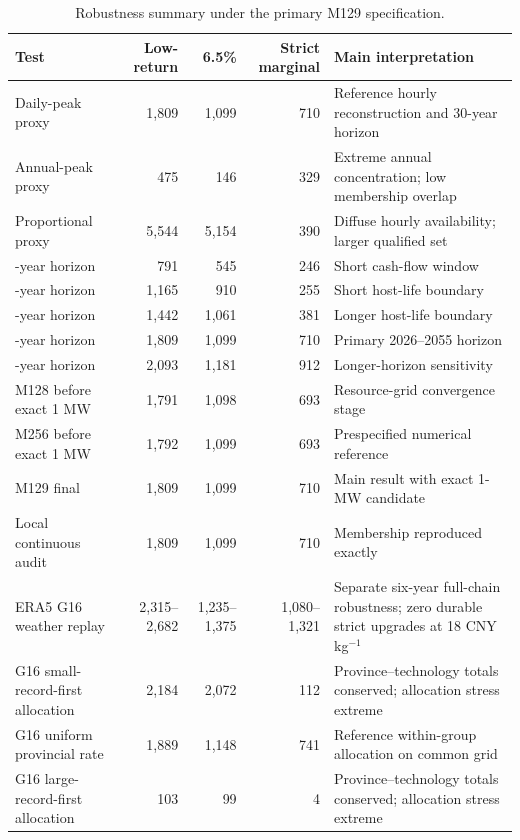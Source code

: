\documentclass[pdflatex,sn-nature]{sn-jnl}
\begin{document}
\begin{table}[t]
\caption{Robustness summary under the primary M129 specification.}\label{tab:robustness}
\centering
\footnotesize
\begin{tabularx}{\textwidth}{>{\raggedright\arraybackslash}p{}rrr>{\raggedright\arraybackslash}X}
\toprule
Test & Low-return & 6.5\% & Strict marginal & Main interpretation \\
\midrule
Daily-peak proxy & 1,809 & 1,099 & 710 & Reference hourly reconstruction and 30-year horizon \\
Annual-peak proxy & 475 & 146 & 329 & Extreme annual concentration; low membership overlap \\
Proportional proxy & 5,544 & 5,154 & 390 & Diffuse hourly availability; larger qualified set \\
15-year horizon & 791 & 545 & 246 & Short cash-flow window \\
20-year horizon & 1,165 & 910 & 255 & Short host-life boundary \\
25-year horizon & 1,442 & 1,061 & 381 & Longer host-life boundary \\
30-year horizon & 1,809 & 1,099 & 710 & Primary 2026--2055 horizon \\
35-year horizon & 2,093 & 1,181 & 912 & Longer-horizon sensitivity \\
M128 before exact 1 MW & 1,791 & 1,098 & 693 & Resource-grid convergence stage \\
M256 before exact 1 MW & 1,792 & 1,099 & 693 & Prespecified numerical reference \\
M129 final & 1,809 & 1,099 & 710 & Main result with exact 1-MW candidate \\
Local continuous audit & 1,809 & 1,099 & 710 & Membership reproduced exactly \\
ERA5 G16 weather replay & 2,315--2,682 & 1,235--1,375 & 1,080--1,321 & Separate six-year full-chain robustness; zero durable strict upgrades at 18 CNY kg$^{-1}$ \\
G16 small-record-first allocation & 2,184 & 2,072 & 112 & Province--technology totals conserved; allocation stress extreme \\
G16 uniform provincial rate & 1,889 & 1,148 & 741 & Reference within-group allocation on common grid \\
G16 large-record-first allocation & 103 & 99 & 4 & Province--technology totals conserved; allocation stress extreme \\
\bottomrule
\end{tabularx}
\end{table}
\end{document}

